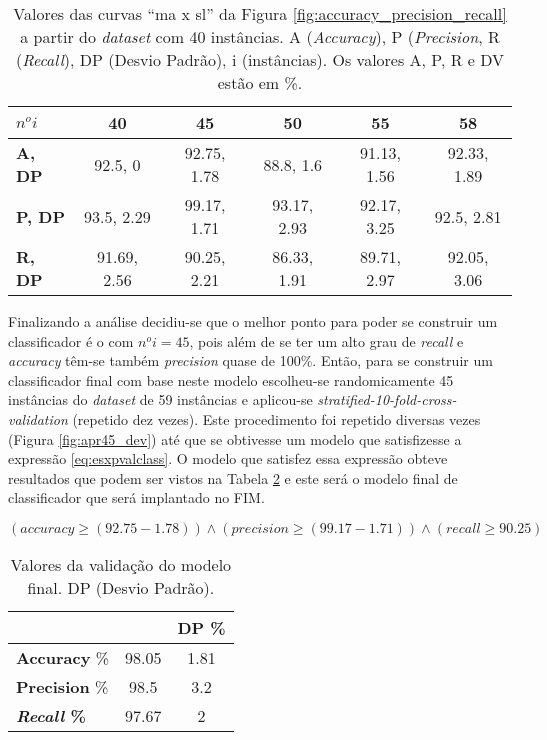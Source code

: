 \begin{table}[!htp]
  \centering
  \begin{tabular}{ |l|c c c c c|}
    \hline
       {\bf \textbf{$n^o i$}} & {\bf 40} & {\bf 45} & {\bf 50} & {\bf 55} & {\bf 58} \\
    \hline
       \textbf{A, DP} & 92.5, 0 & 92.75, 1.78 & 88.8, 1.6 & 91.13, 1.56 & 92.33, 1.89 \\
    \hline
       \textbf{P, DP} & 93.5, 2.29 & 99.17, 1.71 & 93.17, 2.93 &  92.17, 3.25 & 92.5, 2.81 \\
    \hline
       \textbf{R, DP} & 91.69, 2.56 & 90.25, 2.21 & 86.33, 1.91 & 89.71, 2.97 & 92.05, 3.06 \\
    \hline
  \end{tabular}
  \caption{Valores das curvas ``ma x sl'' da Figura \ref{fig:accuracy_precision_recall} a partir do \textit{dataset} com 40 instâncias. A (\textit{Accuracy}), P (\textit{Precision}, R (\textit{Recall}), DP (Desvio Padrão), i (instâncias). Os valores A, P, R e DV estão em \%.}
  \label{table:valorescurva}
\end{table}

Finalizando a análise decidiu-se que o melhor ponto para poder se construir um classificador é o com $n^o i = 45$, pois além de se ter um alto grau de \textit{recall} e \textit{accuracy} têm-se também \textit{precision} quase de 100\%. Então, para se construir um classificador final com base neste modelo escolheu-se randomicamente 45 instâncias do \textit{dataset} de 59 instâncias e aplicou-se \textit{stratified-10-fold-cross-validation} (repetido dez vezes). Este procedimento foi repetido diversas vezes (Figura \ref{fig:apr45_dev}) até que se obtivesse um modelo que satisfizesse a expressão \ref{eq:esxpvalclass}. O modelo que satisfez essa expressão obteve resultados que podem ser vistos na Tabela \ref{table:valmodelfinal} e este será o modelo final de classificador que será implantado no FIM. 

\begin{equation}
  (\textit{accuracy} \geq (92.75-1.78)) \wedge (\textit{precision} \geq (99.17-1.71)) \wedge (\textit{recall} \geq 90.25)
  \label{eq:esxpvalclass}
\end{equation}

\begin{table}[!htp]
  \centering
  \begin{tabular}{ |l|c|c|}
    \hline
       {\bf } & {\bf } & {\bf DP \%} \\
    \hline
       \textbf{Accuracy} \% & 98.05 & 1.81 \\
    \hline
       \textbf{Precision} \% & 98.5 & 3.2 \\
    \hline
       \textbf{\textit{Recall} \%} & 97.67 & 2 \\
    \hline
  \end{tabular}
  \caption{Valores da validação do modelo final. DP (Desvio Padrão).}
  \label{table:valmodelfinal}
\end{table}

